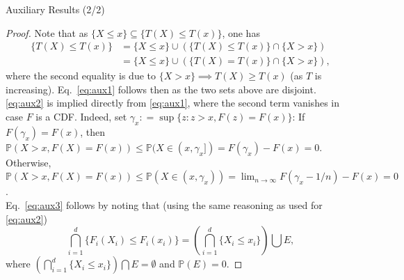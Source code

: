 \documentclass[envcountsect]{beamer}
\newcommand{\bP}{\mathbb{P}}
\theoremstyle{definition}
\theoremstyle{plain}
\begin{document}
\begin{frame}{Auxiliary Results (2/2)}
	\begin{proof}
		Note that as $\{X\le x\} \subseteq \{T(X)\le T(x)\}$, one has
		\begin{align*}
			\{T(X)\le T(x)\} &= \{X\le x\} \cup \left( \{T(X)\le T(x)\} \cap \{X > x\}\right) \\
			& = \{X\le x\} \cup \left( \{T(X)= T(x)\} \cap \{X > x\}\right), 
		\end{align*}
		where the second equality is due to $\{X >x \} \implies T(X) \ge T(x)$ (as $T$ is increasing). Eq.~\eqref{eq:aux1} follows then as the two sets above are disjoint.
		\eqref{eq:aux2} is implied directly from \eqref{eq:aux1}, where the second term vanishes in case $F$ is a CDF. Indeed, set $\gamma_x: = \sup \{z: z>x, F(z) = F(x)\}$: If $F(\gamma_x) = F(x)$, then
		$\bP(X>x, F(X) = F(x)) \le \bP(X\in (x, \gamma_x]) = F(\gamma_x) - F(x)=0$. 
		Otherwise, $\bP(X>x, F(X) = F(x)) \le \bP(X\in (x, \gamma_x)) = \lim_{n\to \infty}F(\gamma_x - 1/n) - F(x)=0$.\\
		Eq.~\eqref{eq:aux3} follows by noting that (using the same reasoning as used for \eqref{eq:aux2})
		\begin{equation*}
			\bigcap_{i=1}^d \{F_i(X_i) \le F_i(x_i)\} = \left(\bigcap_{i=1}^d \{X_i \le x_i\} \right) \bigcup E,
		\end{equation*} 
		where
		$ \left(\bigcap_{i=1}^d \{X_i \le x_i\} \right) \bigcap E = \emptyset$ and $\bP(E) = 0$.
	\end{proof}
\end{frame}
\end{document}
